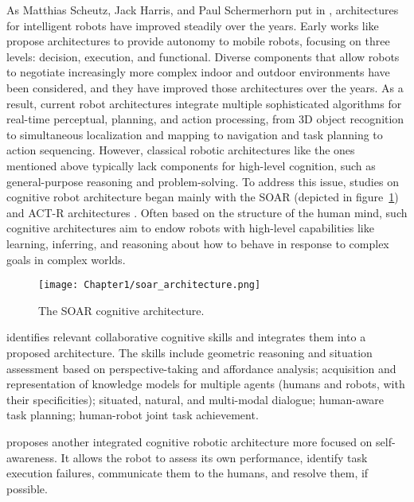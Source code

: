 As Matthias Scheutz, Jack Harris, and Paul Schermerhorn put in \cite{scheutz_systematic_2013}, architectures for intelligent robots have improved steadily over the years. 
Early works like \cite{chatila_integrated_1992,alami_designing_1993,alami_architecture_1998} propose architectures to provide autonomy to mobile robots, focusing on three levels: decision, execution, and functional. Diverse components that allow robots to negotiate increasingly more complex indoor and outdoor environments have been considered, and they have improved those architectures over the years. As a result, current robot architectures integrate multiple sophisticated algorithms for real-time perceptual, planning, and action processing, from 3D object recognition to simultaneous localization and mapping to navigation and task planning to action sequencing. However, classical robotic architectures like the ones mentioned above typically lack components for high-level cognition, such as general-purpose reasoning and problem-solving. 
To address this issue, studies on cognitive robot architecture began mainly with the SOAR (depicted in figure~\ref{fig:soar}) and ACT-R architectures \cite{laird_soar_1987,anderson2004integrated}.
Often based on the structure of the human mind, such cognitive architectures aim to endow robots with high-level capabilities like learning, inferring, and reasoning about how to behave in response to complex goals in complex worlds. 

\begin{figure}[h]
    \center
    \texttt{[image: Chapter1/soar\_architecture.png]}
    \caption{The SOAR cognitive architecture.}
    \label{fig:soar}
\end{figure}

\cite{lemaignan_artificial_2017} identifies relevant collaborative cognitive skills and integrates them into a proposed architecture. The skills include geometric reasoning and situation assessment based on perspective-taking and affordance analysis; acquisition and representation of knowledge models for multiple agents (humans and robots, with their specificities); situated, natural, and multi-modal dialogue; human-aware task planning; human-robot joint task achievement.

\cite{thierauf_toward_2024} proposes another integrated cognitive robotic architecture more focused on self-awareness. It allows the robot to assess its own performance, identify task execution failures, communicate them to the humans, and resolve them, if possible. 



